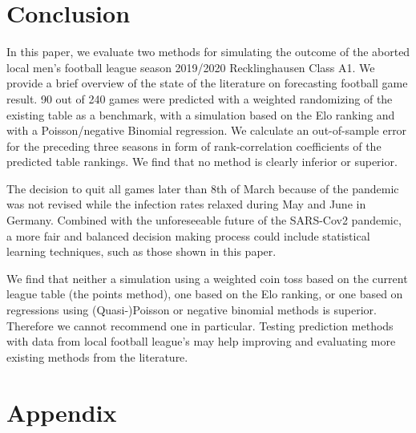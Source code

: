 \documentclass[12pt,a4paper]{article}
\begin{document}
\hypertarget{conclusion}{%
\section{Conclusion}\label{conclusion}}

In this paper, we evaluate two methods for simulating the outcome of the
aborted local men's football league season 2019/2020 Recklinghausen
Class A1. We provide a brief overview of the state of the literature on
forecasting football game result. 90 out of 240 games were predicted
with a weighted randomizing of the existing table as a benchmark, with a
simulation based on the Elo ranking and with a Poisson/negative Binomial
regression. We calculate an out-of-sample error for the preceding three
seasons in form of rank-correlation coefficients of the predicted table
rankings. We find that no method is clearly inferior or superior.

The decision to quit all games later than 8th of March because of the
pandemic was not revised while the infection rates relaxed during May
and June in Germany. Combined with the unforeseeable future of the
SARS-Cov2 pandemic, a more fair and balanced decision making process
could include statistical learning techniques, such as those shown in
this paper.

We find that neither a simulation using a weighted coin toss based on
the current league table (the points method), one based on the Elo
ranking, or one based on regressions using (Quasi-)Poisson or negative
binomial methods is superior. Therefore we cannot recommend one in
particular. Testing prediction methods with data from local football
league's may help improving and evaluating more existing methods from
the literature.

\newpage

\printbibliography

\newpage

\hypertarget{appendix}{%
\section{Appendix}\label{appendix}}
\end{document}
